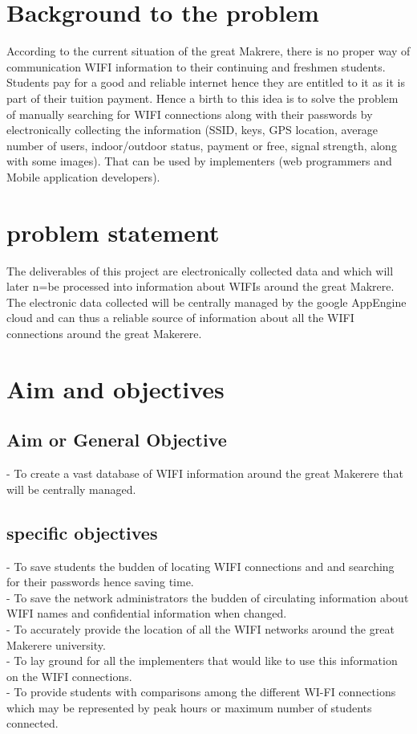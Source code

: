 \documentclass[14pt, a4paper]{article}
\begin{document}
				

			\section{Background to the problem}
According to the current situation of the great Makrere, there is no proper way of communication WIFI information to their continuing and freshmen students. Students pay for a good and reliable internet hence they are entitled to it as it is part of their tuition payment. Hence a birth to this idea is to solve the problem of manually searching for WIFI connections along with their passwords by electronically collecting the information (SSID, keys, GPS location, average number of users, indoor/outdoor status, payment or free, signal strength, along with some images). That can be used by implementers (web programmers and Mobile application developers).
 

				
			\section{problem statement}
The deliverables of this project are electronically collected data and which will later n=be processed into information  about WIFIs around the great Makrere. The electronic data collected will be centrally managed by the google AppEngine cloud and can thus a reliable source of information about all the WIFI connections around the great Makerere.
			
			
			
			\section{Aim and objectives}
			
				\subsection{Aim or General Objective}
- To create a vast database of WIFI information around the great Makerere that will be centrally managed.

		
		
				
				\subsection{specific objectives}
-	To save students the budden of locating WIFI connections and and searching for their passwords hence saving time.\\
-	To save the network administrators the budden of circulating information about WIFI names and confidential information when changed.\\
-	To accurately provide the location of all the WIFI networks around the great Makerere university.\\
-	To lay ground for all the implementers that would like to use this information on the WIFI connections.\\
-	To provide students with comparisons among the different WI-FI connections which may be represented by peak hours or maximum number of students connected.\\
\end{document}
